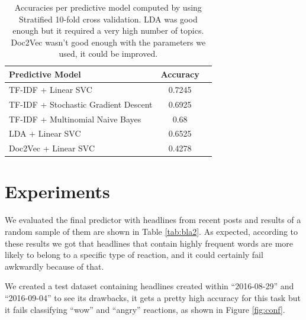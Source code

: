 \documentclass[9pt]{article}
\begin{document}
\begin{table}
\centering
\scriptsize 
\caption{Accuracies per predictive model computed by using Stratified 10-fold cross validation. LDA was good enough but it required a very high number of topics. Doc2Vec wasn't good enough with the parameters we used, it could be improved.}
\label{tab:compares}
\def\arraystretch{1.5}%
 \begin{tabular}{ |>{\centering\arraybackslash}m{4cm} | c | c |}
    \hline
    \rowcolor{LightCyan} Predictive Model & Accuracy \\
    \hline
TF-IDF + Linear SVC & 0.7245\\
    \hline
TF-IDF + Stochastic Gradient Descent & 0.6925\\
    \hline
TF-IDF + Multinomial Naive Bayes & 0.68\\
    \hline
LDA + Linear SVC & 0.6525 \\
    \hline
Doc2Vec + Linear SVC & 0.4278 \\
    \hline
  \end{tabular}
\end{table}


\section{Experiments}

We evaluated the final predictor with headlines from recent posts and results of a random sample of them are shown in Table \ref{tab:bla2}. As expected, according to these results we got that headlines that contain highly frequent words are more likely to belong to a specific type of reaction, and it could certainly fail awkwardly because of that.

We created a test dataset containing headlines created within ``2016-08-29'' and ``2016-09-04'' to see its drawbacks, it gets a pretty high accuracy for this task but it fails classifying ``wow'' and ``angry'' reactions, as shown in Figure \ref{fig:conf}.
\end{document}
